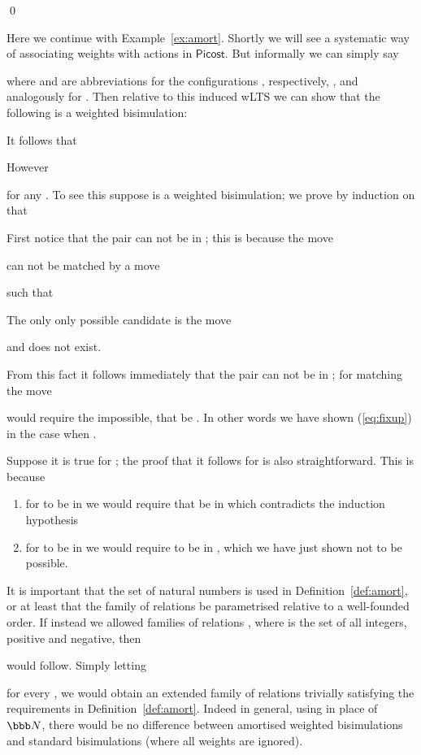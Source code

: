 \documentclass{LMCS}
\newcommand{\pfn}[1]{\mathsf{#1}}  \newcommand{\cfn}[1]{\mathsf{#1}}  \newcommand{\ownfnt}[1]{{\mathsf{#1}}}
\newcommand{\picost}{\ensuremath{\pfn{Picost}}\xspace}
\newcommand{\nats}{\ensuremath{\bbb N}\xspace}
\newcommand{\EndDefBox}{\null\hfill}
\newcommand{\boxHere}{\global\let\EndProof\empty\EndDefBox}
\begin{document}
 \qed
\begin{exa}\label{def:amort.more}
  Here we continue with Example~\ref{ex:amort}. Shortly we will see a
  systematic way of associating weights with actions in \picost. But
  informally we can simply say

where  and  are abbreviations for the configurations 
, respectively,
, 
and analogously for . Then relative to this induced 
wLTS we can show that the following is a weighted bisimulation:

It follows that


However 

for any . To see this suppose  is a weighted
bisimulation; we prove by induction on  that

First notice that the pair  can not be in
; this is because the move 

can not be matched by a move

such that 

The only only possible candidate is the move

and  does not exist. 

From this fact it follows immediately that the pair
 can not be in ; 
for matching the move 

would require the impossible, that   be
. In other words we have shown (\ref{eq:fixup}) in the case 
when .

Suppose it is true for ; the proof that it follows for  is
also straightforward. This is because
\begin{enumerate}[]
\item for  to be in  we would
require that  be in 
which contradicts the induction hypothesis

\item for  to be in  we would
require   to be in , which we have
just shown not to be possible.
\end{enumerate}


It  is important that the set of natural numbers  is used in
Definition~\ref{def:amort}, or at least that the family of relations
be parametrised relative to a well-founded order. If instead we
allowed families of relations , where  is the
set of all integers, positive and negative, then

would follow. Simply letting 

for every , we would obtain an extended family of relations trivially
satisfying the requirements in Definition~\ref{def:amort}.
Indeed in general, using  in place of \nats, there would be no difference between 
amortised weighted bisimulations and standard bisimulations (where all weights are ignored). 
 \boxHere
\end{exa}
\end{document}
